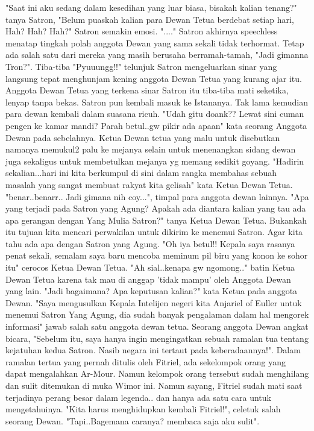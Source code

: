 \documentclass[a4paper,11pt,final]{article}
\begin{document}
"Saat ini aku sedang dalam kesedihan yang luar biasa, bisakah kalian tenang?" tanya Satron, "Belum puaskah kalian para Dewan Tetua berdebat setiap hari, Hah? Hah? Hah?" Satron semakin emosi.
"...." Satron akhirnya speechless menatap tingkah polah anggota Dewan yang sama sekali tidak terhormat.
Tetap ada salah satu dari mereka yang masih berusaha berramah-tamah, "Jadi gimanna Tron?".
Tiba-tiba "Pyuuungg!!" telunjuk Satron mengeluarkan sinar yang langsung tepat menghunjam kening anggota Dewan Tetua yang kurang ajar itu.
Anggota Dewan Tetua yang terkena sinar Satron itu tiba-tiba mati seketika, lenyap tanpa bekas.
Satron pun kembali masuk ke Istananya. Tak lama kemudian para dewan kembali dalam suasana ricuh.
"Udah gitu doank?? Lewat sini cuman pengen ke kamar mandi? Parah betul..gw pikir ada apaan" kata seorang Anggota Dewan pada sebelahnya.
Ketua Dewan tetua yang malu untuk disebutkan namanya memukul2 palu ke mejanya selain untuk menenangkan sidang dewan juga sekaligus untuk membetulkan mejanya yg memang sedikit goyang.
"Hadirin sekalian...hari ini kita berkumpul di sini dalam rangka membahas sebuah masalah yang sangat membuat rakyat kita gelisah" kata Ketua Dewan Tetua.
"benar..benarr.. Jadi gimana nih coy...", timpal para anggota dewan lainnya.
"Apa yang terjadi pada Satron yang Agung? Apakah ada diantara kalian yang tau ada apa gerangan dengan Yang Mulia Satron?" tanya Ketua Dewan Tetua.
Bukankah itu tujuan kita mencari perwakilan untuk dikirim ke menemui Satron. Agar kita tahu ada apa dengan Satron yang Agung.
"Oh iya betul!! Kepala saya rasanya penat sekali, semalam saya baru mencoba meminum pil biru yang konon ke sohor itu" cerocos Ketua Dewan Tetua.
"Ah sial..kenapa gw ngomong.." batin Ketua Dewan Tetua karena tak mau di anggap 'tidak mampu' oleh Anggota Dewan yang lain. "Jadi bagaimana? Apa keputusan kalian?" kata Ketua pada anggota Dewan.
"Saya mengusulkan Kepala Intelijen negeri kita Anjariel of Euller untuk menemui Satron Yang Agung, dia sudah banyak pengalaman dalam hal mengorek informasi" jawab salah satu anggota dewan tetua.
Seorang anggota Dewan angkat bicara, "Sebelum itu, saya hanya ingin mengingatkan sebuah ramalan tua tentang kejatuhan kedua Satron. Nasib negara ini tertaut pada keberadaannya!".
Dalam ramalan tertua yang pernah ditulis oleh Fitriel, ada sekelompok orang yang dapat mengalahkan Ar-Mour. Namun kelompok orang tersebut sudah menghilang dan sulit ditemukan di muka Wimor ini.
Namun sayang, Fitriel sudah mati saat terjadinya perang besar dalam legenda.. dan hanya ada satu cara untuk mengetahuinya. "Kita harus menghidupkan kembali Fitriel!", celetuk salah seorang Dewan. "Tapi..Bagemana caranya? membaca saja aku sulit".
\end{document}
